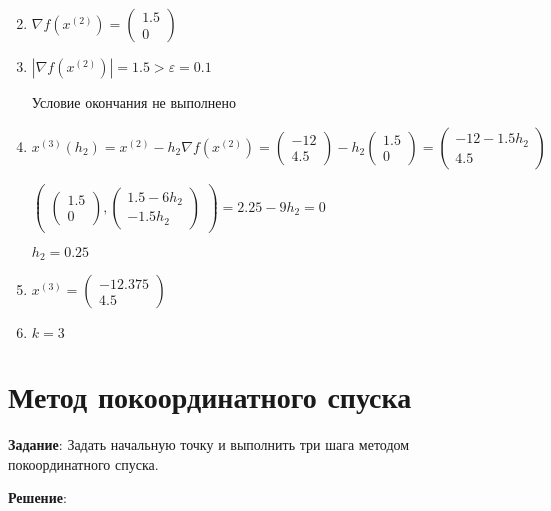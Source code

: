\documentclass{article}
\begin{document}
\begin{enumerate}
    \setcounter{enumi}{1}
    \item $\nabla f(x^{(2)}) = \begin{pmatrix} 1.5 \\ 0 \end{pmatrix}$
    \item $|\nabla f(x^{(2)})| = 1.5 > \varepsilon = 0.1$
    
        Условие окончания не выполнено
    \item $x^{(3)}(h_{2}) = x^{(2)} - h_{2}\nabla f(x^{(2)}) =
        \begin{pmatrix} -12 \\ 4.5 \end{pmatrix} - h_{2}
        \begin{pmatrix} 1.5 \\ 0 \end{pmatrix} =
        \begin{pmatrix} -12 - 1.5h_{2} \\ 4.5 \end{pmatrix}$
        
        
        $\begin{pmatrix}
            \begin{pmatrix} 1.5 \\ 0 \end{pmatrix},
            \begin{pmatrix} 1.5 - 6h_{2} \\ -1.5h_{2} \end{pmatrix}
        \end{pmatrix} = 2.25 - 9h_{2} = 0$
        
        
        $h_{2} = 0.25$
    \item $x^{(3)} = \begin{pmatrix} -12.375 \\ 4.5 \end{pmatrix}$
    \item $k = 3$
\end{enumerate}

\pagebreak

\section{Метод покоординатного спуска}

\textbf{Задание}: Задать начальную точку и выполнить три шага методом покоординатного спуска.

\textbf{Решение}:
\end{document}
